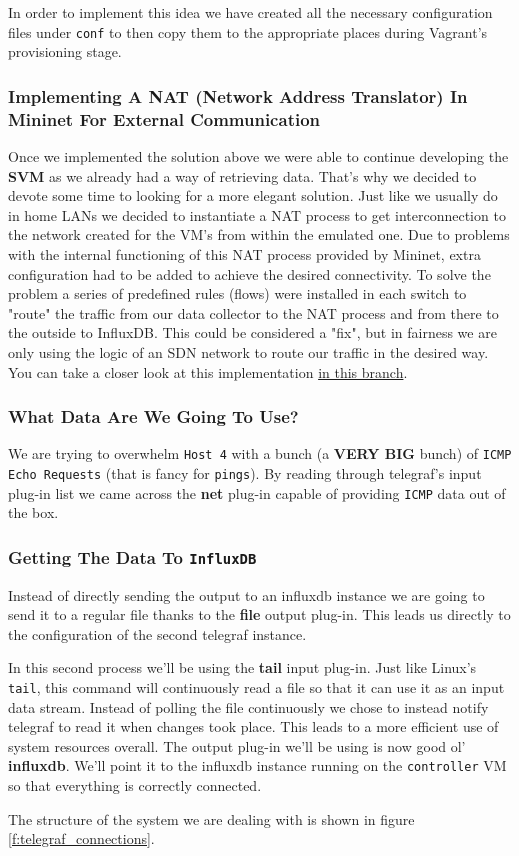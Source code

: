\documentclass[12pt]{report}
\newcommand{\newpar} {
    \vskip 1cm
}
\begin{document}
				\newpar
				In order to implement this idea we have created all the necessary configuration files under \texttt{conf} to then copy them to the appropriate places during Vagrant's provisioning stage.

			\subsubsection{Implementing A NAT (\textbf{N}etwork \textbf{A}ddress \textbf{T}ranslator) In Mininet For External Communication}
				Once we implemented the solution above we were able to continue developing the \textbf{SVM} as we already had a way of retrieving data. That's why we decided to devote some time to looking for a more elegant solution. Just like we usually do in home LANs we decided to instantiate a NAT process to get interconnection to the network created for the VM's from within the emulated one. Due to problems with the internal functioning of this NAT process provided by Mininet, extra configuration had to be added to achieve the desired connectivity. To solve the problem a series of predefined rules (flows) were installed in each switch to "route" the traffic from our data collector to the NAT process and from there to the outside to InfluxDB.  This could be considered a "fix", but in fairness we are only using the logic of an SDN network to route our traffic in the desired way.  You can take a closer look at this implementation \href{https://github.com/GAR-Project/project/tree/full-connectivity}{in this branch}.

			\subsubsection{What Data Are We Going To Use?}
				We are trying to overwhelm \texttt{Host 4} with a bunch (a \textbf{VERY BIG} bunch) of \texttt{ICMP Echo Requests} (that is fancy for \texttt{pings}). By reading through telegraf's input plug-in list we came across the \textbf{net} plug-in capable of providing \texttt{ICMP} data out of the box.

			\subsubsection{Getting The Data To \texttt{InfluxDB}}
				Instead of directly sending the output to an influxdb instance we are going to send it to a regular file thanks to the \textbf{file} output plug-in. This leads us directly to the configuration of the second telegraf instance.
				\newpar
				In this second process we'll be using the \textbf{tail} input plug-in. Just like Linux's \texttt{tail}, this command will continuously read a file so that it can use it as an input data stream. Instead of polling the file continuously we chose to instead notify telegraf to read it when changes took place. This leads to a more efficient use of system resources overall. The output plug-in we'll be using is now good ol' \textbf{influxdb}. We'll point it to the influxdb instance running on the \texttt{controller} VM so that everything is correctly connected.
				\newpar
				The structure of the system we are dealing with is shown in figure \ref{f:telegraf_connections}.
\end{document}
